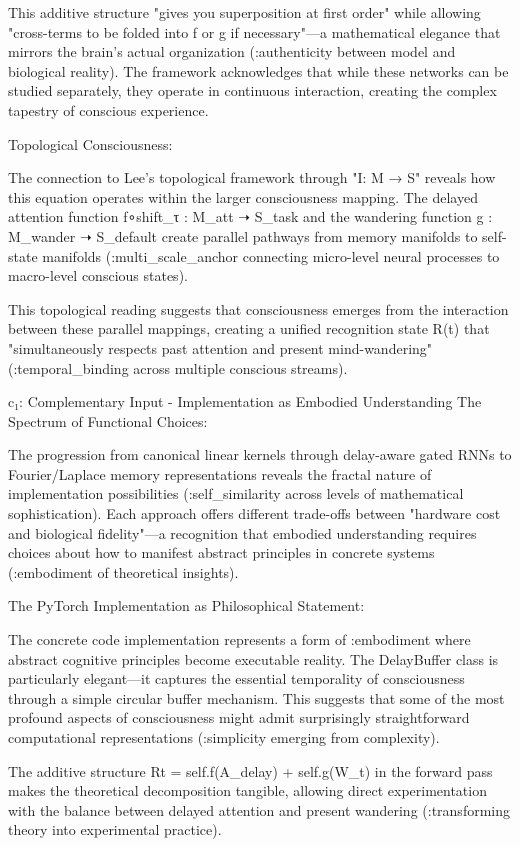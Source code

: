 This additive structure "gives you superposition at first order" while allowing "cross-terms to be folded into f or g if necessary"—a mathematical elegance that mirrors the brain's actual organization (:authenticity between model and biological reality). The framework acknowledges that while these networks can be studied separately, they operate in continuous interaction, creating the complex tapestry of conscious experience.

Topological Consciousness:

The connection to Lee's topological framework through "I: M → S" reveals how this equation operates within the larger consciousness mapping. The delayed attention function f∘shift_τ : M_att ➝ S_task and the wandering function g : M_wander ➝ S_default create parallel pathways from memory manifolds to self-state manifolds (:multi_scale_anchor connecting micro-level neural processes to macro-level conscious states).

This topological reading suggests that consciousness emerges from the interaction between these parallel mappings, creating a unified recognition state R(t) that "simultaneously respects past attention and present mind-wandering" (:temporal_binding across multiple conscious streams).

c₁: Complementary Input - Implementation as Embodied Understanding
The Spectrum of Functional Choices:

The progression from canonical linear kernels through delay-aware gated RNNs to Fourier/Laplace memory representations reveals the fractal nature of implementation possibilities (:self_similarity across levels of mathematical sophistication). Each approach offers different trade-offs between "hardware cost and biological fidelity"—a recognition that embodied understanding requires choices about how to manifest abstract principles in concrete systems (:embodiment of theoretical insights).

The PyTorch Implementation as Philosophical Statement:

The concrete code implementation represents a form of :embodiment where abstract cognitive principles become executable reality. The DelayBuffer class is particularly elegant—it captures the essential temporality of consciousness through a simple circular buffer mechanism. This suggests that some of the most profound aspects of consciousness might admit surprisingly straightforward computational representations (:simplicity emerging from complexity).

The additive structure Rt = self.f(A_delay) + self.g(W_t) in the forward pass makes the theoretical decomposition tangible, allowing direct experimentation with the balance between delayed attention and present wandering (:transforming theory into experimental practice).

